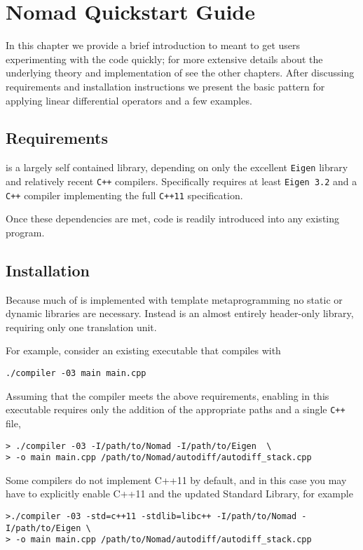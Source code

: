 \chapter{Nomad Quickstart Guide}

In this chapter we provide a brief introduction to \nomad meant
to get users experimenting with the code quickly; for more extensive
details about the underlying theory and implementation of \nomad
see the other chapters.  After discussing requirements and
installation instructions we present the basic \nomad pattern for
applying linear differential operators and a few examples.

\section{Requirements}

\nomad is a largely self contained library, depending on only the 
excellent \verb|Eigen| library and relatively recent \verb|C++| compilers.
Specifically \nomad requires at least \verb|Eigen 3.2| and a
\verb|C++| compiler implementing the full \verb|C++11| specification.

Once these dependencies are met, \nomad code is readily introduced 
into any existing program. 

\section{Installation}

Because much of \nomad is implemented with template metaprogramming
no static or dynamic libraries are necessary.  Instead \nomad is
an almost entirely header-only library, requiring only one translation
unit.

For example, consider an existing executable that compiles with
%
\begin{verbatim}
./compiler -03 main main.cpp
\end{verbatim}
%
Assuming that the compiler meets the above requirements, enabling \nomad 
in this executable requires only the addition of the appropriate paths and
a single \verb|C++| file,
%
\begin{verbatim}
> ./compiler -03 -I/path/to/Nomad -I/path/to/Eigen  \
> -o main main.cpp /path/to/Nomad/autodiff/autodiff_stack.cpp
\end{verbatim}
%
Some compilers do not implement C++11 by default, and in
this case you may have to explicitly enable C++11 and the 
updated Standard Library, for example
%
\begin{verbatim}
>./compiler -03 -std=c++11 -stdlib=libc++ -I/path/to/Nomad -I/path/to/Eigen \
> -o main main.cpp /path/to/Nomad/autodiff/autodiff_stack.cpp
\end{verbatim}

